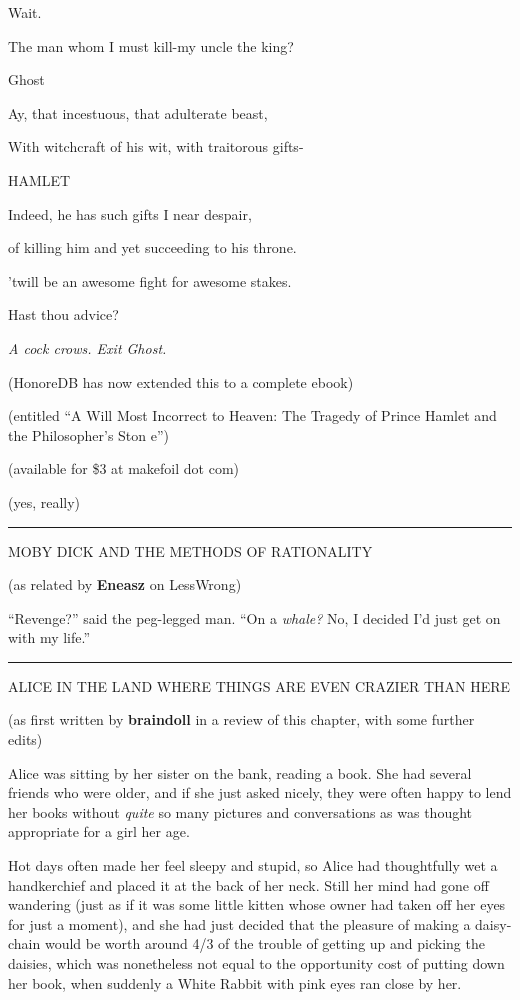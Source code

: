 Wait.

The man whom I must kill-my uncle the king?

Ghost

Ay, that incestuous, that adulterate beast,

With witchcraft of his wit, with traitorous gifts-

HAMLET

Indeed, he has such gifts I near despair,

of killing him and yet succeeding to his throne.

'twill be an awesome fight for awesome stakes.

Hast thou advice?

\emph{A cock crows. Exit Ghost.}

(HonoreDB has now extended this to a complete ebook)

(entitled ``A Will Most Incorrect to Heaven: The Tragedy of Prince Hamlet and the Philosopher's Ston e'')

(available for \$3 at makefoil dot com)

(yes, really)

\begin{center}\rule{3in}{0.4pt}\end{center}

MOBY DICK AND THE METHODS OF RATIONALITY

(as related by \textbf{Eneasz} on LessWrong)

``Revenge?'' said the peg-legged man. ``On a \emph{whale?} No, I decided I'd just get on with my life.''

\begin{center}\rule{3in}{0.4pt}\end{center}

ALICE IN THE LAND WHERE THINGS ARE EVEN CRAZIER THAN HERE

(as first written by \textbf{braindoll} in a review of this chapter, with some further edits)

Alice was sitting by her sister on the bank, reading a book. She had several friends who were older, and if she just asked nicely, they were often happy to lend her books without \emph{quite} so many pictures and conversations as was thought appropriate for a girl her age.

Hot days often made her feel sleepy and stupid, so Alice had thoughtfully wet a handkerchief and placed it at the back of her neck. Still her mind had gone off wandering (just as if it was some little kitten whose owner had taken off her eyes for just a moment), and she had just decided that the pleasure of making a daisy-chain would be worth around 4/3 of the trouble of getting up and picking the daisies, which was nonetheless not equal to the opportunity cost of putting down her book, when suddenly a White Rabbit with pink eyes ran close by her.

